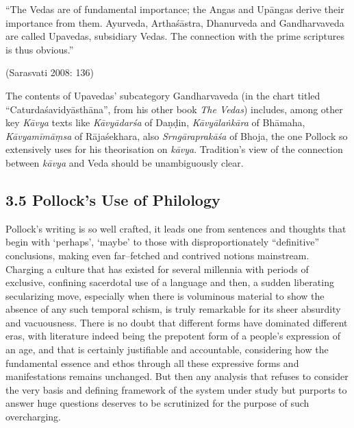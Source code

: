 \begin{myquote}
“The Vedas are of fundamental importance; the Angas and Upāngas derive their importance from them. Ayurveda, Arthaśāstra, Dhanurveda and Gandharvaveda are called Upavedas, subsidiary Vedas. The connection with the prime scriptures is thus obvious.”
\end{myquote}

\hfill (Sarasvati 2008: 136)

The contents of Upavedas’ subcategory Gandharvaveda (in the chart titled “Caturdaśavidyāsthāna”, from his other book \textit{The Vedas}) includes, among other key \textit{Kāvya} texts like \textit{Kāvyādarśa} of Daṇḍin, \textit{Kāvyālaṅkāra} of Bhāmaha, \textit{Kāvyamīmāṃsa} of Rājaśekhara, also \textit{Srngāraprakāśa} of Bhoja, the one Pollock so extensively uses for his theorisation on \textit{kāvya}. Tradition’s view of the connection between \textit{kāvya} and Veda should be unambiguously clear.


\subsection*{3.5 Pollock’s Use of Philology}

Pollock’s writing is so well crafted, it leads one from sentences and thoughts that begin with ‘perhaps’, ‘maybe’ to those with disproportionately “definitive” conclusions, making even far–fetched and contrived notions mainstream. Charging a culture that has existed for several millennia with periods of exclusive, confining sacerdotal use of a language and then, a sudden liberating secularizing move, especially when there is voluminous material to show the absence of any such temporal schism, is truly remarkable for its sheer absurdity and vacuousness. There is no doubt that different forms have dominated different eras, with literature indeed being the prepotent form of a people’s expression of an age, and that is certainly justifiable and accountable, considering how the fundamental essence and ethos through all these expressive forms and manifestations remains unchanged. But then any analysis that refuses to consider the very basis and defining framework of the system under study but purports to answer huge questions deserves to be scrutinized for the purpose of such overcharging.

